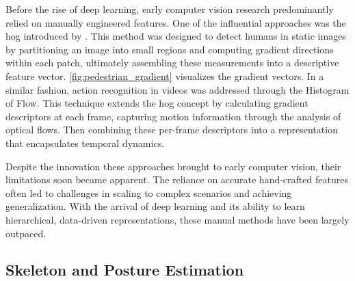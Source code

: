 Before the rise of deep learning, early computer vision research predominantly relied on manually engineered features. One of the influential approaches was the \acrfull{hog} introduced by \textcite{dalal_histogram_of_gradients}. This method was designed to detect humans in static images by partitioning an image into small regions and computing gradient directions within each patch, ultimately assembling these measurements into a descriptive feature vector. \autoref{fig:pedestrian_gradient} visualizes the gradient vectors. In a similar fashion, action recognition in videos was addressed through the Histogram of Flow\cite{dalal_histogram_of_flow}. This technique extends the \acrshort{hog} concept by calculating gradient descriptors at each frame, capturing motion information through the analysis of optical flows. Then combining these per-frame descriptors into a representation that encapsulates temporal dynamics. 

Despite the innovation these approaches brought to early computer vision, their limitations soon became apparent. The reliance on accurate hand-crafted features often led to challenges in scaling to complex scenarios and achieving generalization. With the arrival of deep learning and its ability to learn hierarchical, data-driven representations, these manual methods have been largely outpaced. 

\subsection{Skeleton and Posture Estimation}
\label{ssec:skeleton_posture_estimation}

